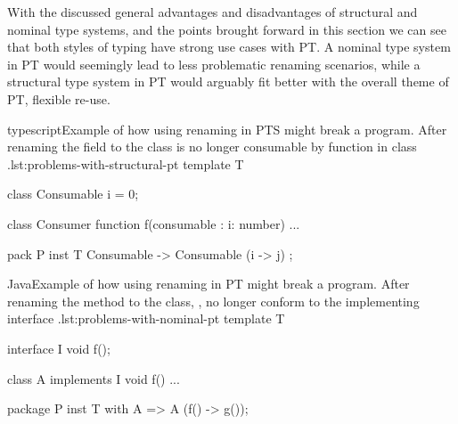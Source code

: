 With the discussed general advantages and disadvantages of structural and nominal type systems, and the points brought forward in this section we can see that both styles of typing have strong use cases with PT\@.
A nominal type system in PT would seemingly lead to less problematic renaming scenarios, while a structural type system in PT would arguably fit better with the overall theme of PT, flexible re-use.


\begin{code}{typescript}{Example of how using renaming in PTS might break a program. After renaming the field  to  the class  is no longer consumable by function  in class .}{lst:problems-with-structural-pt}
    template T {
        class Consumable {
            i = 0;
        }

        class Consumer {
            function f(consumable : {i: number}) {
                ...
            }
        }
    }

    pack P {
        inst T { Consumable -> Consumable (i -> j) };
    }
\end{code}

\begin{code}{Java}{Example of how using renaming in PT might break a program. After renaming the method  to  the class, , no longer conform to the implementing interface .}{lst:problems-with-nominal-pt}
    template T {
        interface I {
            void f();
        }

        class A implements I {
            void f() { ... }
        }
    }

    package P {
        inst T with A => A (f() -> g());
    }
\end{code}